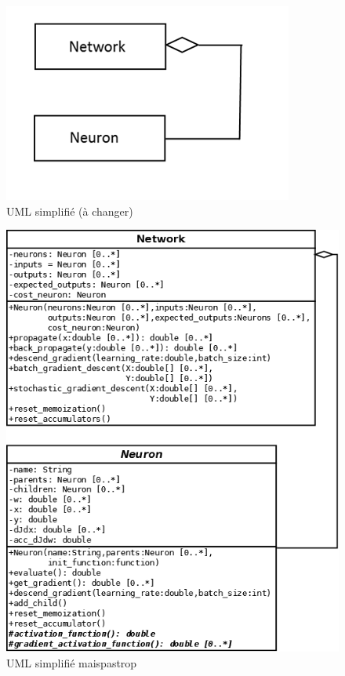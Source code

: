 \documentclass{report}
\begin{document}
\begin{figure}
\begin{center}
\includegraphics[scale=0.5]{images/uml_simplifie_imp1.png}
\caption{UML simplifié (à changer)}
\label{UML simplifié}
\end{center}
\end{figure}

\begin{figure}
\begin{center}
\includegraphics[scale=0.3]{images/uml_simplifie_maispastrop_imp1.png}
\caption{UML simplifié maispastrop}
\label{UML simplifié maispastrop}
\end{center}
\end{figure}
\end{document}
